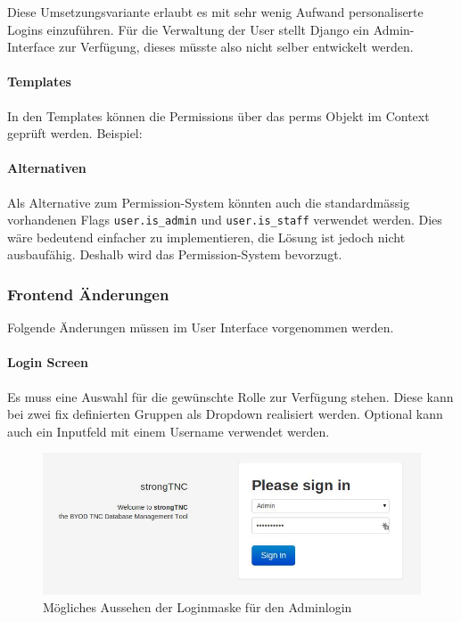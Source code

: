 Diese Umsetzungsvariante erlaubt es mit sehr wenig Aufwand personaliserte Logins
einzuführen. Für die Verwaltung der User stellt Django ein Admin-Interface zur
Verfügung, dieses müsste also nicht selber entwickelt werden.

\paragraph*{Templates}

In den Templates können die Permissions über das perms Objekt im Context geprüft werden. 
Beispiel:


\paragraph*{Alternativen}

Als Alternative zum Permission-System könnten auch die standardmässig vorhandenen Flags 
\texttt{user.is\_admin} und \texttt{user.is\_staff} verwendet werden. Dies wäre bedeutend 
einfacher zu implementieren, die Lösung ist jedoch nicht ausbaufähig. Deshalb wird das 
Permission-System bevorzugt.


\subsubsection{Frontend Änderungen}
Folgende Änderungen müssen im User Interface vorgenommen werden.

\paragraph*{Login Screen}

Es muss eine Auswahl für die gewünschte Rolle zur Verfügung stehen. Diese kann bei zwei fix 
definierten Gruppen als Dropdown realisiert werden. Optional kann auch ein Inputfeld mit einem 
Username verwendet werden. 

\begin{figure}[H]
	\centering
	\includegraphics[width=\textwidth]{images/rollen-konzept/login-admin.jpg}
	\caption{Mögliches Aussehen der Loginmaske für den Adminlogin}
\end{figure}

